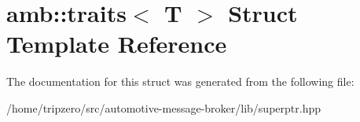 \hypertarget{structamb_1_1traits}{\section{amb\-:\-:traits$<$ T $>$ Struct Template Reference}
\label{structamb_1_1traits}
}


The documentation for this struct was generated from the following file\-:\begin{DoxyCompactItemize}
\item 
/home/tripzero/src/automotive-\/message-\/broker/lib/superptr.\-hpp\end{DoxyCompactItemize}

